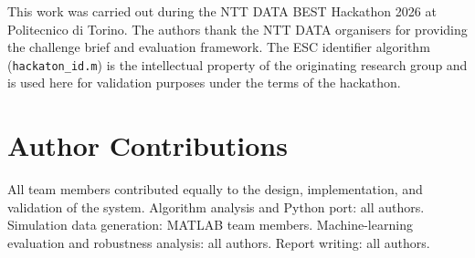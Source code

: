 \documentclass[11pt,a4paper]{article}
\begin{document}
This work was carried out during the NTT DATA BEST Hackathon 2026 at
Politecnico di Torino.
The authors thank the NTT DATA organisers for providing the challenge brief
and evaluation framework.
The ESC identifier algorithm (\texttt{hackaton\_id.m}) is the intellectual
property of the originating research group and is used here for validation
purposes under the terms of the hackathon.

\section*{Author Contributions}

All team members contributed equally to the design, implementation,
and validation of the system.
Algorithm analysis and Python port: all authors.
Simulation data generation: MATLAB team members.
Machine-learning evaluation and robustness analysis: all authors.
Report writing: all authors.

\end{document}
